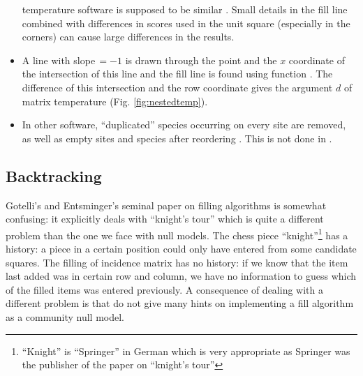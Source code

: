 \documentclass[a4paper,10pt,twocolumn]{article}
\begin{document}
\begin{itemize}
    temperature software \citep{AtmarPat93} is supposed to be similar
    \citep{RodGir06}. Small details in the fill line combined with
    differences in scores used in the unit square (especially in the
    corners) can cause large differences in the results.
  \item A line with slope\,$= -1$ is drawn through the point and the $x$
    coordinate of the intersection of this line and the fill line is
    found using function . The difference of this
    intersection and the row coordinate gives the argument $d$ of matrix
    temperature (Fig. \ref{fig:nestedtemp}).
  \item In other software, ``duplicated'' species occurring on every
    site are removed, as well as empty sites and species after
    reordering \cite{RodGir06}. This is not done in .
\end{itemize}

\subsection{Backtracking}

Gotelli's and Entsminger's seminal paper \cite{GotelliEnt01} on filling
algorithms is somewhat confusing: it explicitly deals with ``knight's
tour'' which is quite a different problem than the one we face with
null models.  The chess piece ``knight''\footnote{``Knight'' is
  ``Springer'' in German which is very appropriate as Springer was the
  publisher of the paper on ``knight's tour''} has a history:
a piece in a certain position could only have entered from some
candidate squares. The filling of incidence matrix has no  history:
if we know that the item last added was in certain row and column, we
have no information to guess which of the filled items was entered
previously. A consequence of dealing with a different problem is that
\citet{GotelliEnt01} do not give many hints on implementing a fill
algorithm as a community null model.
\end{document}

